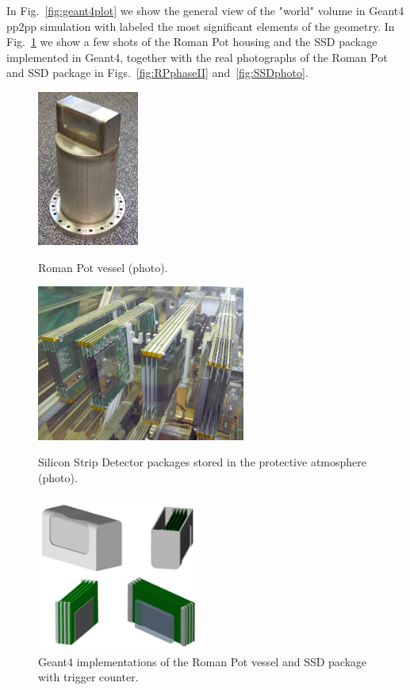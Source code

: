 In Fig.~\ref{fig:geant4plot} we show the general view of the "world" volume in Geant4 pp2pp simulation with labeled the most significant elements of the geometry. In Fig.~\ref{fig:g4Rp} we show a few shots of the Roman Pot housing and the SSD package implemented in Geant4, together with the real photographs of the Roman Pot and SSD package in Figs.~\ref{fig:RPphaseII} and~\ref{fig:SSDphoto}.

\begin{figure}[h]
	\centering
	\parbox{0.2\textwidth}{
		\centering
		\includegraphics[height=145pt]{graphics/rpSim/romanpot.jpg}
		\caption[Roman Pot vessel (photo).]{Roman Pot vessel (photo).\newline}
		\label{fig:RPphoto}
	}%
	\quad%
	\parbox{0.40\textwidth}{
		\centering
		\includegraphics[height=145pt]{graphics/rpSim/SSD.jpg}
		\caption[Silicon Strip Detector packages stored in the protective atmosphere (photo).]{Silicon Strip Detector packages stored in the protective atmosphere (photo).\newline}
		\label{fig:SSDphoto}
	}%
	\quad%
	\parbox{0.33\textwidth}{
		\centering
		\includegraphics[height=145pt]{graphics/rpSim/g4Rp.png}
		\caption{Geant4 implementations of the Roman Pot vessel and SSD package with trigger counter.}
		\label{fig:g4Rp}
	}
\end{figure}\vspace{-15pt}

